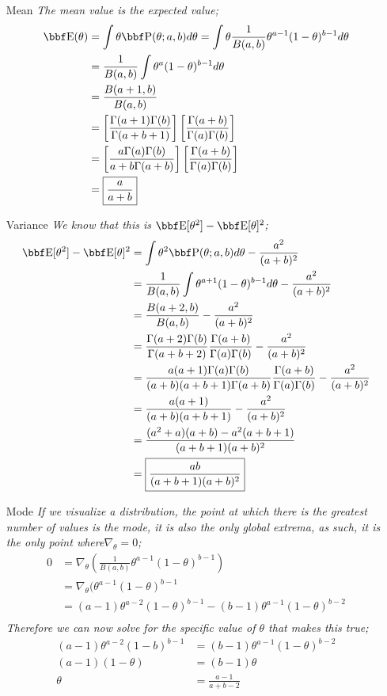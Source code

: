 \documentclass[12pt,letterpaper,fleqn]{hmcpset}
\begin{document}
\begin{solution}
\begin{enumerate}
\item[Mean] \textit{The mean value is the expected value; }
\begin{align*}
\EE(\theta) &= \int \theta \pro d\theta = \int \theta \frac{1}{B(a,b)} \theta^{a-1} (1-\theta)^{b-1} d\theta\\
&= \frac{1}{B(a,b)} \int \theta^{a}(1-\theta)^{b-1} d\theta \\
&= \frac{B(a+1,b)}{B(a,b)}\\
&= \left[\frac{\Gamma(a+1)\Gamma(b)}{\Gamma(a+b+1)}\right] \left[\frac{\Gamma(a+b)}{\Gamma(a)\Gamma(b)}\right]\\
&=\left[\frac{a\Gamma(a)\Gamma(b)}{a+b\Gamma(a+b)}\right] \left[\frac{\Gamma(a+b)}{\Gamma(a)\Gamma(b)}\right]\\
&=\boxed{\frac{a}{a+b}}
\end{align*}
\item[Variance] \textit{We know that this is $\EE[\theta^2]-\EE[\theta]^2$;}
\begin{align*}
\EE[\theta^2]-\EE[\theta]^2&= \int \theta^2 \pro d\theta - \frac{a^2}{(a+b)^2}\\
&=\frac{1}{B(a,b)}\int \theta^{a+1}(1-\theta)^{b-1}d \theta  - \frac{a^2}{(a+b)^2}\\
&= \frac{B(a+2,b)}{B(a,b)} - \frac{a^2}{(a+b)^2}\\
&= \frac{\Gamma(a+2)\Gamma(b)}{\Gamma(a+b+2)}\frac{\Gamma(a+b)}{\Gamma(a)\Gamma(b)}- \frac{a^2}{(a+b)^2}\\
&= \frac{a(a+1)\Gamma(a)\Gamma(b)}{(a+b)(a+b+1)\Gamma(a+b)}\frac{\Gamma(a+b)}{\Gamma(a)\Gamma(b)}- \frac{a^2}{(a+b)^2}\\
&=\frac{a(a+1)}{(a+b)(a+b+1)}- \frac{a^2}{(a+b)^2}\\
&=\frac{(a^2+a)(a+b)-a^2(a+b+1)}{(a+b+1)(a+b)^2}\\
&=\boxed{\frac{ab}{(a+b+1)(a+b)^2}}
\end{align*}
\item[Mode] \textit{If we visualize a distribution, the point at which there is the greatest number of values is the mode, it is also the only global extrema, as such, it is the only point where$\nabla_{\theta} = 0$;}
\begin{align*}
0 &= \nabla_{\theta}\left(\frac{1}{B(a,b)}\theta^{a-1}(1-\theta)^{b-1}\right)\\
 &=\nabla_{\theta}(\theta^{a-1}(1-\theta)^{b-1}\\
 &=(a-1)\theta^{a-2}(1-\theta)^{b-1}-(b-1)\theta^{a-1}(1-\theta)^{b-2}\\
\end{align*}
\textit{Therefore we can now solve for the specific value of $\theta$ that makes this true; }
\begin{align*}
(a-1)\theta^{a-2}(1-b)^{b-1} &= (b-1)\theta^{a-1}(1-\theta)^{b-2}\\
(a-1)(1-\theta)&=(b-1)\theta\\
\theta &= \frac{a-1}{a+b-2}
\end{align*}
\end{enumerate}
\end{solution}
\newpage
\end{document}

